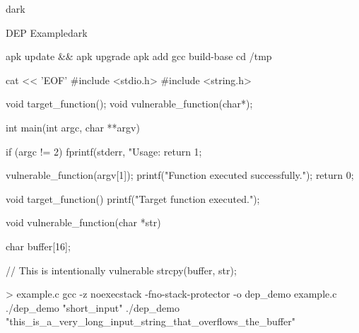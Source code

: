 \begin{baseBoxThree}{}{dark}
    \smallskip
    \begin{baseBoxThree}{DEP Example}{dark}
        \begin{posnex}
apk update && apk upgrade
apk add gcc build-base
cd /tmp

{
cat << 'EOF'
#include <stdio.h>
#include <string.h>

void target_function();
void vulnerable_function(char*);

int main(int argc, char **argv) {
        if (argc != 2) {
                fprintf(stderr, "Usage: %
                return 1;
        }
    
        vulnerable_function(argv[1]);
        printf("Function executed successfully.\n");
        return 0;
}

void target_function() {
        printf("Target function executed.\n");
}

void vulnerable_function(char *str) {
        char buffer[16];

        // This is intentionally vulnerable
        strcpy(buffer, str);
}
} > example.c
gcc -z noexecstack -fno-stack-protector -o dep_demo example.c
./dep_demo "short_input"
./dep_demo "this_is_a_very_long_input_string_that_overflows_the_buffer"

        \end{posnex}
    \end{baseBoxThree}
    \smallskip
\end{baseBoxThree}